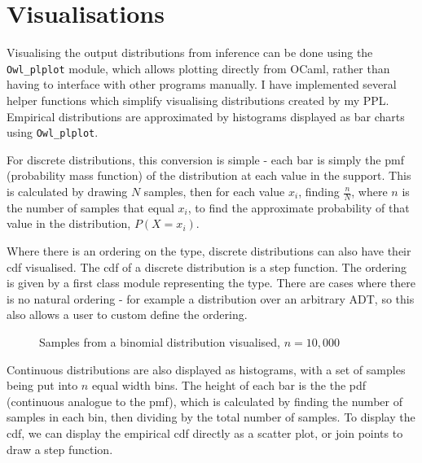 \section{Visualisations}
Visualising the output distributions from inference can be done using the \texttt{Owl\_plplot} module, which allows plotting directly from OCaml, rather than having to interface with other programs manually. I have implemented several helper functions which simplify visualising distributions created by my PPL. Empirical distributions are approximated by histograms displayed as bar charts using \texttt{Owl\_plplot}.
	
For discrete distributions, this conversion is simple - each bar is simply the pmf (probability mass function) of the distribution at each value in the support. This is calculated by drawing $N$ samples, then for each value $x_i$, finding $\frac{n}{N}$, where $n$ is the number of samples that equal $x_i$, to find the approximate probability of that value in the distribution, $P(X = x_i)$.
	
Where there is an ordering on the type, discrete distributions can also have their cdf visualised. The cdf of a discrete distribution is a step function. The ordering is given by a first class module representing the type. There are cases where there is no natural ordering - for example a distribution over an arbitrary ADT, so this also allows a user to custom define the ordering.
% 
\begin{figure}[!htb]
	\centering
	\qquad
	\caption{Samples from a binomial distribution visualised, $n=10,000$}
	\label{fig:vis-binom}
\end{figure}
% 
Continuous distributions are also displayed as histograms, with a set of samples being put into $n$ equal width bins. The height of each bar is the the pdf (continuous analogue to the pmf), which is calculated by finding the number of samples in each bin, then dividing by the total number of samples. To display the cdf, we can display the empirical cdf directly as a scatter plot, or join points to draw a step function.
	
